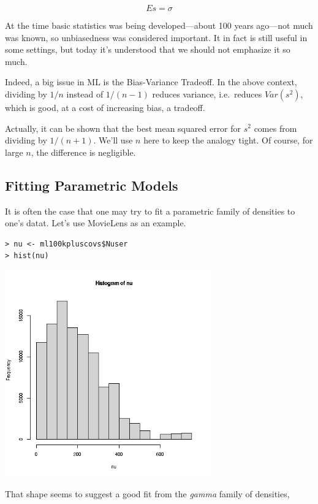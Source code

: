 \begin{equation}
Es = \sigma
\end{equation}

At the time basic statistics was being developed---about 100 years
ago---not much was known, so unbiasedness was considered important.
It in fact is still useful in some settings, but today it's understood 
that we should not emphasize it so much.

Indeed, a big issue in ML is the Bias-Variance Tradeoff.  In the above
context, dividing by $1/n$ instead of $1/(n-1)$ reduces variance, 
i.e.\ reduces $Var(s^2)$, which is good, at a cost of increasing bias, a
tradeoff.

Actually, it can be shown that the best mean squared error for $s^2$
comes from dividing by $1/(n+1)$.  We'll use $n$ here to keep the
analogy tight.  Of course, for large $n$, the difference is negligible.

\subsection{Fitting Parametric Models}

It is often the case that one may try to fit a parametric family of
densities to one's datat.  Let's use MovieLens as an example.

\begin{lstlisting}
> nu <- ml100kpluscovs$Nuser
> hist(nu)
\end{lstlisting}

\includegraphics[width=3.5in]{Images/NuserGamma.png}

That shape seems to suggest a good fit from the \textit{gamma} family of
densities,

